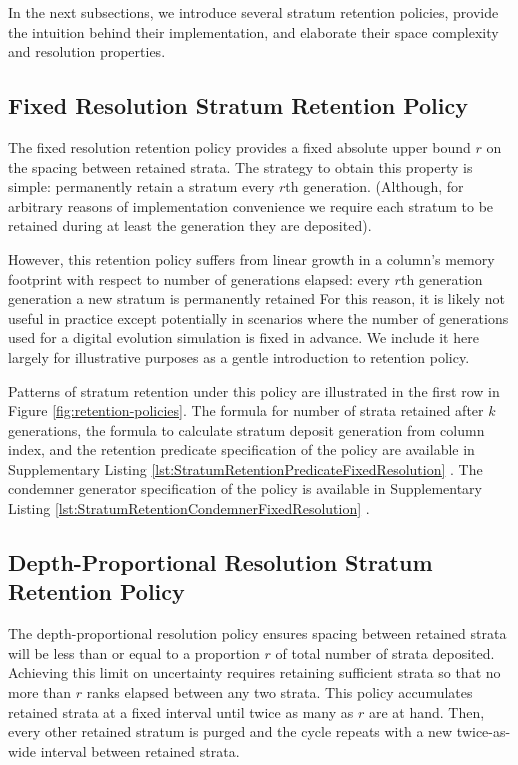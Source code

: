 In the next subsections, we introduce several stratum retention policies, provide the intuition behind their implementation, and elaborate their space complexity and resolution properties.



\subsection{Fixed Resolution Stratum Retention Policy}

The fixed resolution retention policy provides a fixed absolute upper bound $r$ on the spacing between retained strata.
The strategy to obtain this property is simple: permanently retain a stratum every $r$th generation.
(Although, for arbitrary reasons of implementation convenience we require each stratum to be retained during at least the generation they are deposited).

However, this retention policy suffers from linear growth in a column's memory footprint with respect to number of generations elapsed: every $r$th generation generation a new stratum is permanently retained
For this reason, it is likely not useful in practice except potentially in scenarios where the number of generations used for a digital evolution simulation is fixed in advance.
We include it here largely for illustrative purposes as a gentle introduction to retention policy.

Patterns of stratum retention under this policy are illustrated in the first row in Figure \ref{fig:retention-policies}.
The formula for number of strata retained after $k$ generations, the formula to calculate stratum deposit generation from column index, and the retention predicate specification of the policy are available in Supplementary Listing \ref{lst:StratumRetentionPredicateFixedResolution} \citep{moreno2022hstratconceptsupplement}.
The condemner generator specification of the policy is available in Supplementary Listing \ref{lst:StratumRetentionCondemnerFixedResolution} \citep{moreno2022hstratconceptsupplement}.

\subsection{Depth-Proportional Resolution Stratum Retention Policy}

The depth-proportional resolution policy ensures spacing between retained strata will be less than or equal to a proportion $r$ of total number of strata deposited.
Achieving this limit on uncertainty requires retaining sufficient strata so that no more than $r$ ranks elapsed between any two strata.
This policy accumulates retained strata at a fixed interval until twice as many as $r$ are at hand.
Then, every other retained stratum is purged and the cycle repeats with a new twice-as-wide interval between retained strata.

